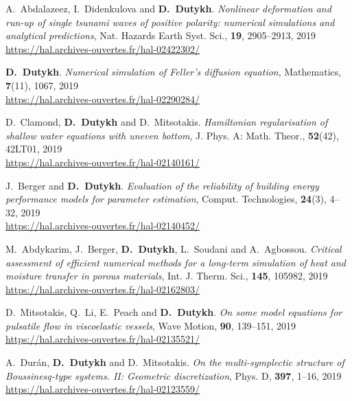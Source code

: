 \begin{etaremune}
  
  \item A.~Abdalazeez, I.~Didenkulova and \textbf{D.~Dutykh}. \textit{Nonlinear deformation and run-up of single tsunami waves of positive polarity: numerical simulations and analytical predictions}, Nat. Hazards Earth Syst. Sci., \textbf{19}, 2905--2913, 2019 \\ %
  \url{https://hal.archives-ouvertes.fr/hal-02422302/}
  
  \item \textbf{D.~Dutykh}. \textit{Numerical simulation of Feller's diffusion equation}, Mathematics, \textbf{7}(11), 1067, 2019 \\ %
  \url{https://hal.archives-ouvertes.fr/hal-02290284/}
  
  \item D.~Clamond, \textbf{D.~Dutykh} and D.~Mitsotakis. \textit{Hamiltonian regularisation of shallow water equations with uneven bottom}, J. Phys. A: Math. Theor., \textbf{52}(42), 42LT01, 2019 \\ %
  \url{https://hal.archives-ouvertes.fr/hal-02140161/}
  
  \item J.~Berger and \textbf{D.~Dutykh}. \textit{Evaluation of the reliability of building energy performance models for parameter estimation}, Comput. Technologies, \textbf{24}(3), 4--32, 2019 \\ %
  \url{https://hal.archives-ouvertes.fr/hal-02140452/}
  
  \item M.~Abdykarim, J.~Berger, \textbf{D.~Dutykh}, L.~Soudani and A.~Agbossou. \textit{Critical assessment of efficient numerical methods for a long-term simulation of heat and moisture transfer in porous materials}, Int. J. Therm. Sci., \textbf{145}, 105982, 2019 \\ %
  \url{https://hal.archives-ouvertes.fr/hal-02162803/}
  
  \item D.~Mitsotakis, Q.~Li, E.~Peach and \textbf{D.~Dutykh}. \textit{On some model equations for pulsatile flow in viscoelastic vessels}, Wave Motion, \textbf{90}, 139--151, 2019 \\ %
  \url{https://hal.archives-ouvertes.fr/hal-02135521/}
  
  \item A.~Dur\'{a}n, \textbf{D.~Dutykh} and D.~Mitsotakis. \textit{On the multi-symplectic structure of Boussinesq-type systems. II: Geometric discretization}, Phys. D, \textbf{397}, 1--16, 2019 \\ %
  \url{https://hal.archives-ouvertes.fr/hal-02123559/}
  

\end{etaremune}
